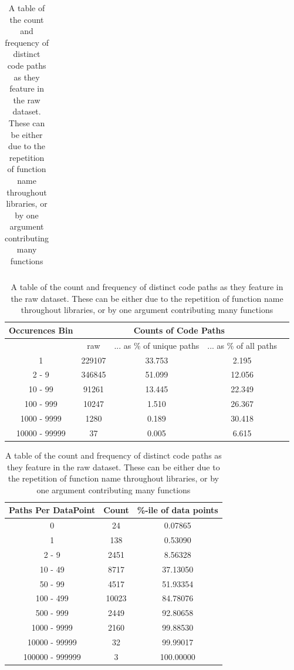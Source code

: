\begin{table}[p]
\begin{tabular}{c | c | c}
    \end{tabular}
    \caption { The most popular the paths of the the dataset. These only account for a very small amount of the data }
    \label{table:function_histogram} 
    \begin{center}
    \begin{tabular}{c | c | c | c c }       
        Occurences Bin   & \multicolumn{3}{c}{Counts of Code Paths}   \\
        \hline
         &     raw &... as \% of unique paths & ... as \% of all paths   \\  
        \hline     
        1 &     229107 &   33.753 &    2.195  \\     
        2 - 9 &     346845 &   51.099 &   12.056  \\     
        10 - 99 &   91261 &   13.445 &   22.349  \\      
        100 - 999 & 10247 &    1.510 &   26.367    \\    
        1000 - 9999 & 1280 &    0.189 &   30.418  \\     
        10000 - 99999 &   37 &    0.005 &    6.615   \\   
                                                                     
    \end{tabular}
        \caption { A table of the count and codepaths as they feature in the raw dataset. A larfe fraction of the datasets are repeated }
    \label{table:function_histogram} 
    \begin{tabular}{c | c | c  }       
    
        Paths Per DataPoint & Count  &  \%-ile of data points \\  
        \hline
        0 &               24  &     0.07865 \\
        1 &               138  &    0.53090 \\
        2 - 9 &           2451  &   8.56328 \\
        10 - 49 &         8717  &   37.13050 \\
        50 - 99 &         4517  &   51.93354 \\
        100 - 499 &       10023  &  84.78076 \\
        500 - 999 &       2449  &   92.80658 \\
        1000 - 9999 &     2160  &   99.88530 \\
        10000 - 99999 &   32  &     99.99017 \\
        100000 - 999999 & 3  &      100.00000 \\

    \end{tabular}
    \caption { A table of the count and frequency of distinct code paths as they feature in the raw dataset. 
        These can be either due to the repetition of function name throughout libraries, or by one argument contributing many functions }
    \label{table:function_histogram} 

    \end{center}
\end{table}


